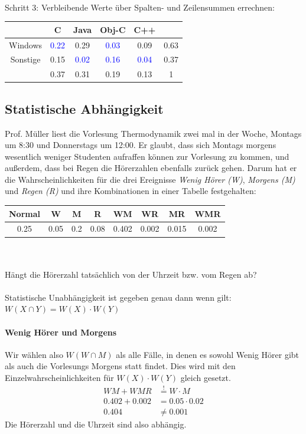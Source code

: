 \documentclass[11pt, a4paper]{article}
\begin{document}
\\
Schritt 3: Verbleibende Werte über Spalten- und Zeilensummen errechnen: \\
\begin{tabular}{|c|cccc|c|}
	\hline
	& C & Java & Obj-C & C++ & \\
	\hline
	Windows & \textcolor{blue}{0.22} & 0.29 & \textcolor{blue}{0.03} & 0.09 & 0.63 \\
	Sonstige & 0.15 & \textcolor{blue}{0.02} & \textcolor{blue}{0.16} & \textcolor{blue}{0.04} & 0.37 \\
	\hline
	& 0.37 & 0.31 & 0.19 & 0.13 & 1 \\
	\hline
\end{tabular}

\subsection{Statistische Abhängigkeit}
Prof. Müller liest die Vorlesung Thermodynamik zwei mal in der Woche, Montags um 8:30 und Donnerstags um 12:00. Er glaubt, dass sich Montags morgens wesentlich weniger Studenten aufraffen können zur Vorlesung zu kommen, und außerdem, dass bei Regen die Hörerzahlen ebenfalls zurück gehen. Darum hat er die Wahrscheinlichkeiten für die drei Ereignisse \emph{Wenig Hörer (W)}, \emph{Morgens (M)} und \emph{Regen (R)} und ihre Kombinationen in einer Tabelle festgehalten: \\

\vspace{\baselineskip}
\begin{tabular}{c|c|c|c|c|c|c|c}
	Normal & W & M & R & WM & WR & MR & WMR \\ \hline
	0.25 & 0.05 & 0.2 & 0.08 & 0.402 & 0.002 & 0.015 & 0.002
\end{tabular}\\
\\
Hängt die Hörerzahl tatsächlich von der Uhrzeit bzw. vom Regen ab? \\
\\
Statistische Unabhängigkeit ist gegeben genau dann wenn gilt: $W(X \cap Y) = W(X) \cdot W(Y)$
\paragraph{Wenig Hörer und Morgens} Wir wählen also $W(W \cap M)$ als alle Fälle, in denen es sowohl Wenig Hörer gibt als auch die Vorlesungs Morgens statt findet. Dies wird mit den Einzelwahrscheinlichkeiten für $W(X) \cdot W(Y)$ gleich gesetzt.
\begin{align*}
	WM + WMR &\overset{!}{=} W \cdot M \\
	0.402 + 0.002 &= 0.05 \cdot 0.02 \\
	0.404 &\neq 0.001
\end{align*}
Die Hörerzahl und die Uhrzeit sind also abhängig.
\end{document}
